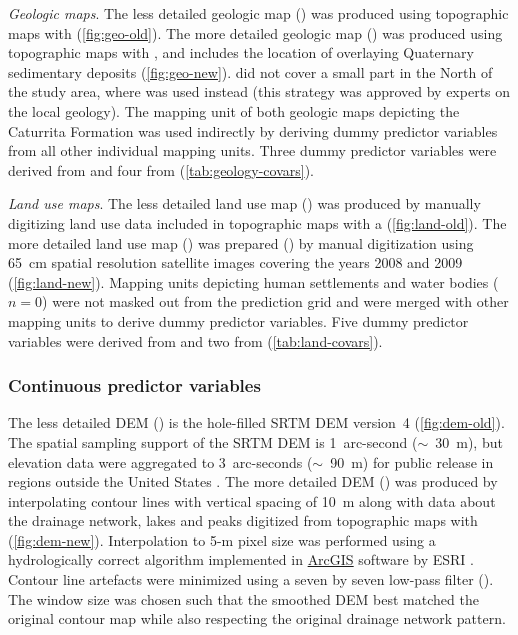 \noindent\textit{Geologic maps}. The less detailed geologic map (\geoOld) was produced using topographic maps 
with  \cite{GasparettoEtAl1988} (\autoref{fig:geo-old}). The more detailed geologic map (\geoNew) 
was produced using topographic maps with , and includes the location of overlaying Quaternary 
sedimentary deposits \cite{MacielFilho1990} (\autoref{fig:geo-new}). \geoNew{} did not cover a small part in 
the North of the study area, where \geoOld{} was used instead (this strategy was approved by experts on the 
local geology). The mapping unit of both geologic maps depicting the Caturrita Formation was used indirectly 
by deriving dummy predictor variables from all other individual mapping units. Three dummy predictor variables 
were derived from \geoOld{} and four from \geoNew{} (\autoref{tab:geology-covars}).

\noindent\textit{Land use maps}. The less detailed land use map (\landOld) was produced by manually digitizing 
land use data included in topographic maps with a  \cite{DSG1980, DSG1992, DSG1992a} 
(\autoref{fig:land-old}). The more detailed land use map (\landNew) was prepared () by manual 
digitization using 65~cm spatial resolution satellite images covering the years 2008 and 2009 
\cite{SamuelRosaEtAl2011a} (\autoref{fig:land-new}). Mapping units depicting human settlements and water bodies 
($n=0$) were not masked out from the prediction grid and were merged with other mapping units to derive dummy 
predictor variables. Five dummy predictor variables were derived from \landNew{} and two from \landOld{} 
(\autoref{tab:land-covars}).

\subsubsection*{Continuous predictor variables}
\label{subsubsec:continuous-covars}

The less detailed DEM (\demOld) is the hole-filled SRTM DEM version~4 \cite{JarvisEtAl2008} 
(\autoref{fig:dem-old}). The spatial sampling support of the SRTM DEM is 1~arc-second ($\sim$~30~m), but 
elevation data were aggregated to 3~arc-seconds ($\sim$~90~m) for public release in regions outside the United 
States \cite{ReuterEtAl2007}. The more detailed DEM (\demNew) was produced by interpolating contour lines with 
vertical spacing of 10~m along with data about the drainage network, lakes and peaks digitized from topographic 
maps with  (\autoref{fig:dem-new}). Interpolation to 5-m pixel size was performed using a 
hydrologically correct algorithm implemented in 
\href{http://resources.arcgis.com/en/help/main/10.1/index.html#/How_Topo_to_Raster_works/009z0000007m000000/}{ 
ArcGIS\textregistered{}} software by ESRI \cite{Hutchinson1989}. Contour line artefacts were minimized using a 
seven by seven low-pass filter (). The window size was chosen such that the smoothed DEM 
best matched the original contour map while also respecting the original drainage network pattern.


